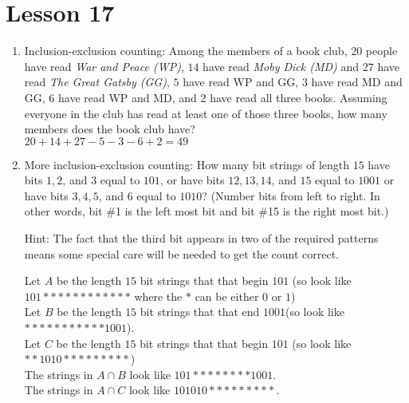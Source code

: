 \documentclass[11pt]{amsart}
\begin{document}
\section{Lesson 17}

\begin{enumerate}

\item Inclusion{-}exclusion counting:  Among the members of a book club,
 $20$ people have read {\itshape War and Peace (WP)}, $14$ have read
{\itshape Moby Dick (MD)} and  $27$ have read {\itshape The Great Gatsby (GG)}, $5$ have read WP and GG, $3$ have read MD and GG, $6$ have read WP and MD, and $2$ have read all three books. Assuming everyone in the club has read at least one of those three books, how many members does the book club have?  \\[3pt]

{\color{blue} $20+14+27 - 5 -3- 6+ 2 = 49$}\\[5pt]

\item  More inclusion{-}exclusion counting: How many bit strings of length $15$ have bits $1,2$, and $3$  equal to $101$, or have bits $12,13,14$, and $15$ equal to $1001$ or
have bits $3,4,5$, and $6$ equal to $1010$? (Number bits from left to right. In other words, bit \#1 is the left most bit and bit \#15 is the right most bit.)

Hint: The fact that the third bit appears in two of the required patterns means some special care will be needed to get the count correct.\\[3pt]
{\color{blue}


Let $A$ be the length $15$ bit strings that that begin $101$ (so look like $101 * * * * * * * * * * * *$
where the $*$ can be either $0$ or $1$)\\[3pt]

Let $B$ be the length $15$ bit strings that that end $1001$(so look like $ * * * * * * * * * * * 1001$).\\[3pt]

Let $C$ be the length $15$ bit strings that that begin $101$ (so look like $* * 1010  * * * * * * * * *$)\\[3pt]

The strings in $A\cap B$ look like $101 * * * * * * * * 1001$.\\[3pt]

The strings in $A\cap C$ look like $101010  * * * * * * * * *$.\\[3pt]

}
\end{enumerate}
\end{document}
